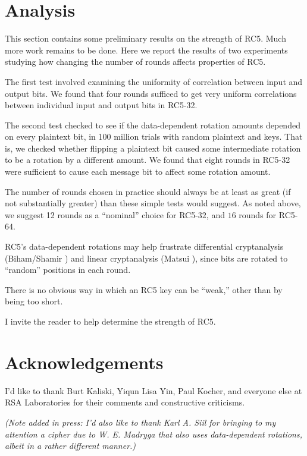 \section{Analysis}

This section contains some preliminary results on the strength of RC5.
Much more work remains to be done.  Here we report the results of two
experiments studying how changing the number of rounds affects
properties of RC5.

The first test involved examining the uniformity of correlation
between input and output bits.  We found that four rounds sufficed to
get very uniform correlations between individual input and output bits
in RC5-32.

The second test checked to see if the data-dependent rotation amounts
depended on every plaintext bit, in 100 million trials with random
plaintext and keys.  That is, we checked whether flipping a plaintext
bit caused some intermediate rotation to be a rotation by a different
amount.  We found that eight rounds in RC5-32 were sufficient to cause
each message bit to affect some rotation amount.

The number of rounds chosen in practice should always be at least
as great (if not substantially greater) than these simple tests
would suggest.  As noted above, we suggest 12 rounds as a ``nominal'' choice
for RC5-$32$, and $16$ rounds for RC5-$64$.

RC5's data-dependent rotations may help frustrate
differential cryptanalysis (Biham/Shamir \cite{BihamSh93})
and linear cryptanalysis (Matsui \cite{Matsui94}), since 
bits are rotated to ``random'' positions in each round.  

There is no obvious way in which an RC5 key can be ``weak,'' other
than by being too short.

I invite the reader to help determine the strength of RC5.

\section{Acknowledgements}

I'd like to thank Burt Kaliski, Yiqun Lisa Yin, Paul Kocher, and everyone
else at RSA Laboratories for their comments and constructive
criticisms.

\noindent
{\em (Note added in press: I'd also like to thank Karl A. Siil for bringing
to my attention a cipher due to W. E. Madryga \cite{Madryga84} that also
uses data-dependent rotations, albeit in a rather different manner.)}

